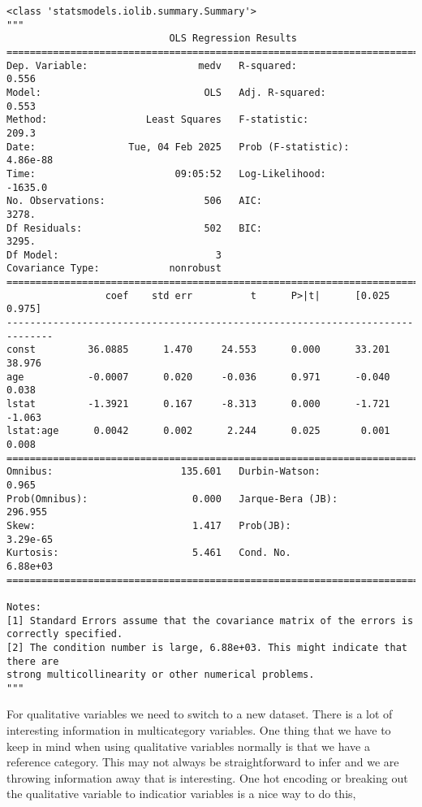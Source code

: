 \documentclass[
  letterpaper,
  DIV=11,
  numbers=noendperiod]{scrreprt}
\begin{document}
\begin{verbatim}
<class 'statsmodels.iolib.summary.Summary'>
"""
                            OLS Regression Results                            
==============================================================================
Dep. Variable:                   medv   R-squared:                       0.556
Model:                            OLS   Adj. R-squared:                  0.553
Method:                 Least Squares   F-statistic:                     209.3
Date:                Tue, 04 Feb 2025   Prob (F-statistic):           4.86e-88
Time:                        09:05:52   Log-Likelihood:                -1635.0
No. Observations:                 506   AIC:                             3278.
Df Residuals:                     502   BIC:                             3295.
Df Model:                           3                                         
Covariance Type:            nonrobust                                         
==============================================================================
                 coef    std err          t      P>|t|      [0.025      0.975]
------------------------------------------------------------------------------
const         36.0885      1.470     24.553      0.000      33.201      38.976
age           -0.0007      0.020     -0.036      0.971      -0.040       0.038
lstat         -1.3921      0.167     -8.313      0.000      -1.721      -1.063
lstat:age      0.0042      0.002      2.244      0.025       0.001       0.008
==============================================================================
Omnibus:                      135.601   Durbin-Watson:                   0.965
Prob(Omnibus):                  0.000   Jarque-Bera (JB):              296.955
Skew:                           1.417   Prob(JB):                     3.29e-65
Kurtosis:                       5.461   Cond. No.                     6.88e+03
==============================================================================

Notes:
[1] Standard Errors assume that the covariance matrix of the errors is correctly specified.
[2] The condition number is large, 6.88e+03. This might indicate that there are
strong multicollinearity or other numerical problems.
"""
\end{verbatim}

For qualitative variables we need to switch to a new dataset. There is a
lot of interesting information in multicategory variables. One thing
that we have to keep in mind when using qualitative variables normally
is that we have a reference category. This may not always be
straightforward to infer and we are throwing information away that is
interesting. One hot encoding or breaking out the qualitative variable
to indicatior variables is a nice way to do this,
\end{document}
